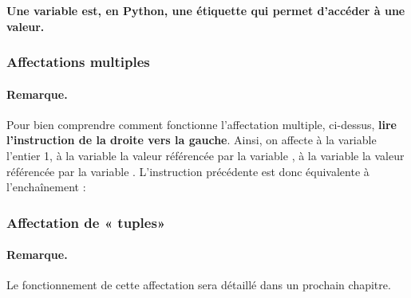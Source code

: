 \documentclass{article}
\newcommand{\tmstrong}[1]{\textbf{#1}}
\begin{document}
\begin{center}
  {\tmstrong{Une variable est, en Python, une étiquette qui permet d'accéder
  à une valeur.}}
\end{center}

{}

\subsubsection{Affectations multiples}

{}

\paragraph{Remarque.} Pour bien comprendre comment fonctionne l'affectation
multiple, ci-dessus, {\tmstrong{lire l'instruction de la droite vers la
gauche}}. Ainsi, on affecte à la variable {} l'entier 1, à la
variable {} la valeur référencée par la variable {}, à
la variable {} la valeur référencée par la variable {}.
L'instruction précédente est donc équivalente à l'enchaînement :

{}

\subsubsection{Affectation de « tuples»}

{}

\paragraph{Remarque.} Le fonctionnement de cette affectation sera détaillé
dans un prochain chapitre.
\end{document}
